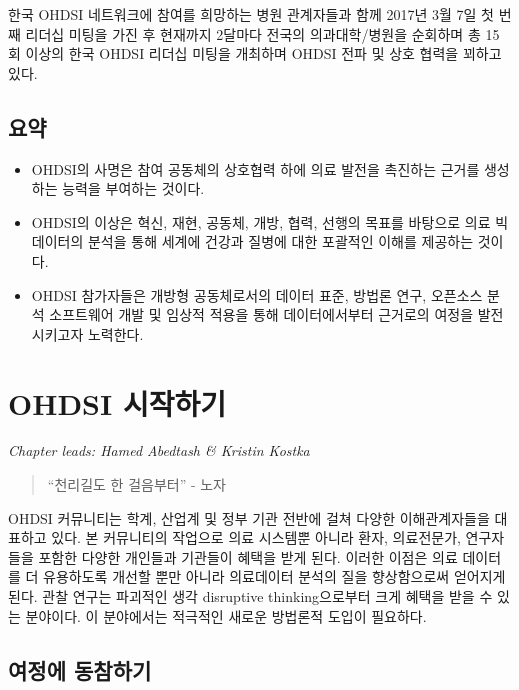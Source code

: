 \documentclass[10.5pt]{book}
\theoremstyle{definition}
\theoremstyle{definition}
\theoremstyle{definition}
\theoremstyle{remark}
\let\BeginKnitrBlock\begin \let\EndKnitrBlock\end
\begin{document}
한국 OHDSI 네트워크에 참여를 희망하는 병원 관계자들과 함께 2017년 3월
7일 첫 번째 리더십 미팅을 가진 후 현재까지 2달마다 전국의
의과대학/병원을 순회하며 총 15회 이상의 한국 OHDSI 리더십 미팅을
개최하며 OHDSI 전파 및 상호 협력을 꾀하고 있다.

\section{요약}

\BeginKnitrBlock{rmdsummary}
\begin{itemize}
\item
  OHDSI의 사명은 참여 공동체의 상호협력 하에 의료 발전을 촉진하는 근거를
  생성하는 능력을 부여하는 것이다.
\item
  OHDSI의 이상은 혁신, 재현, 공동체, 개방, 협력, 선행의 목표를 바탕으로
  의료 빅데이터의 분석을 통해 세계에 건강과 질병에 대한 포괄적인 이해를
  제공하는 것이다.
\item
  OHDSI 참가자들은 개방형 공동체로서의 데이터 표준, 방법론 연구,
  오픈소스 분석 소프트웨어 개발 및 임상적 적용을 통해 데이터에서부터
  근거로의 여정을 발전시키고자 노력한다.
\end{itemize}
\EndKnitrBlock{rmdsummary}

\chapter{OHDSI 시작하기}\label{WhereToBegin}

\emph{Chapter leads: Hamed Abedtash \& Kristin Kostka}

\begin{quote}
``천리길도 한 걸음부터'' - 노자
\end{quote}

OHDSI 커뮤니티는 학계, 산업계 및 정부 기관 전반에 걸쳐 다양한
이해관계자들을 대표하고 있다. 본 커뮤니티의 작업으로 의료 시스템뿐
아니라 환자, 의료전문가, 연구자들을 포함한 다양한 개인들과 기관들이
혜택을 받게 된다. 이러한 이점은 의료 데이터를 더 유용하도록 개선할 뿐만
아니라 의료데이터 분석의 질을 향상함으로써 얻어지게 된다. 관찰 연구는
파괴적인 생각 disruptive thinking으로부터 크게 혜택을 받을 수 있는
분야이다. 이 분야에서는 적극적인 새로운 방법론적 도입이 필요하다.

\section{여정에 동참하기}\label{-}
\end{document}
